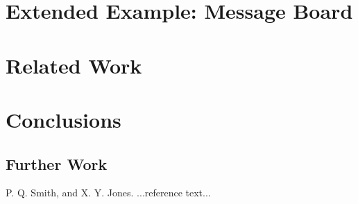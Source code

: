 \documentclass[preprint]{sigplanconf}
\begin{document}
\section{Extended Example: Message Board}
\section{Related Work}
\section{Conclusions}
\subsection{Further Work}





\acks





\begin{thebibliography}{}
\softraggedright

P. Q. Smith, and X. Y. Jones. ...reference text...

\end{thebibliography}
\end{document}
